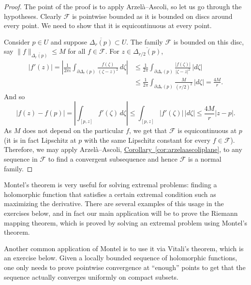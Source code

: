 \documentclass[12pt,openany]{book}
\newcommand{\sabs}[1]{\lvert {#1} \rvert}
\newcommand{\snorm}[1]{\lVert {#1} \rVert}
\newcommand{\abs}[1]{\left\lvert {#1} \right\rvert}
\newcommand{\sF}{{\mathscr{F}}}
\newcommand{\myquote}[1]{``#1''}
\theoremstyle{plain}
\theoremstyle{remark}
\theoremstyle{definition}
\theoremstyle{exercise}
\theoremstyle{example}
\newcommand{\corref}[1]{\hyperref[#1]{Corollary~\ref*{#1}}}
\begin{document}
\begin{proof}
The point of the proof is to apply Arzel\`a--Ascoli, so let us go through
the hypotheses.
Clearly $\sF$ is pointwise bounded as it is bounded on discs around
every point.
We need to show that it is equicontinuous at every point.

Consider $p \in U$ and suppose $\overline{\Delta_r(p)} \subset U$.
The family
$\sF$ is bounded on this disc,
say $\snorm{f}_{\overline{\Delta_r(p)}} \leq M$ for all $f \in \sF$.
For $z \in \overline{\Delta_{r/2}(p)}$,
\begin{equation*}
\begin{split}
\abs{f'(z)}
=
\abs{
\frac{1}{2\pi i}
\int_{\partial \Delta_r(p)}
\frac{f(\zeta)}{{(\zeta-z)}^2} \, d\zeta
}
& \leq
\frac{1}{2\pi}
\int_{\partial \Delta_r(p)}
\frac{\sabs{f(\zeta)}}{\sabs{\zeta-z}^2} \, \sabs{d\zeta}
\\
& \leq
\frac{1}{2\pi}
\int_{\partial \Delta_r(p)}
\frac{M}{{(r/2)}^2} \, \sabs{d\zeta}
=
\frac{4 M}{r}.
\end{split}
\end{equation*}
And so
\begin{equation*}
\abs{f(z)-f(p)}
=
\abs{
\int_{[p,z]} f'(\zeta) \, d\zeta
}
\leq
\int_{[p,z]} \abs{f'(\zeta)} \, \sabs{d\zeta}
\leq
\frac{4 M}{r} \sabs{z-p} .
\end{equation*}
As $M$ does not depend on the particular $f$, we get that $\sF$ is
equicontinuous at $p$ (it is in fact Lipschitz at $p$ with the same
Lipschitz constant for every $f \in \sF$).
Therefore, we may apply Arzel\`a--Ascoli, 
\corref{cor:arzelaascoliplane}, to any sequence in $\sF$
to find a convergent subsequence and hence $\sF$ is a normal family.
\end{proof}

Montel's theorem is very useful for solving extremal problems: 
finding a holomorphic function that satisfies a certain extremal condition
such as maximizing the derivative.  There are several examples of this
usage in the exercises below, and in fact our main application will be to
prove the Riemann mapping theorem, which is proved by solving an extremal
problem using Montel's theorem.

Another common application of Montel is to use it via Vitali's theorem, which is
an exercise below.  Given a locally bounded sequence of holomorphic
functions, one only needs to prove pointwise convergence at \myquote{enough}
points to get that the sequence actually converges uniformly on compact subsets.
\end{document}
